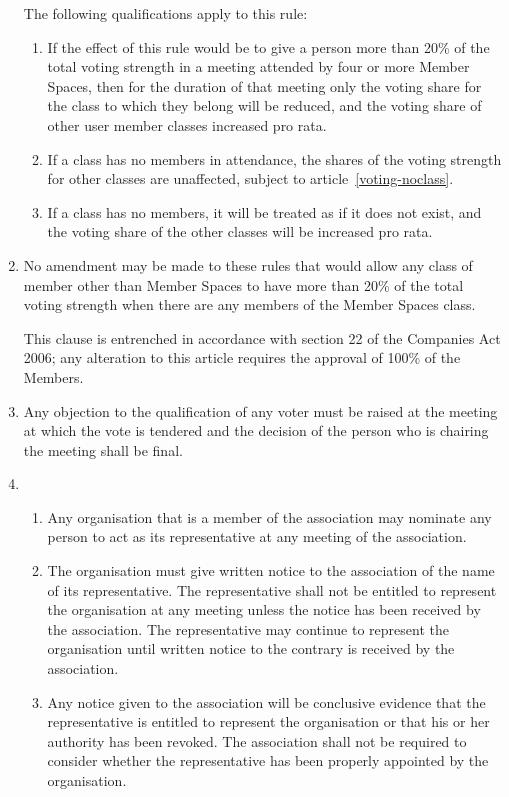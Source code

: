 \begin{enumerate}
    The following qualifications apply to this rule:
    \begin{enumerate}
      \item
        If the effect of this rule would be to give a person more than
        20\% of the total voting strength in a meeting attended by four
        or more Member Spaces, then for the duration of that meeting only
        the voting share for the class to which they belong will be reduced,
        and the voting share of other user member classes increased pro rata.
      \item
        If a class has no members in attendance, the shares of the voting
	strength for other classes are unaffected, subject to 
	article~\ref{voting-noclass}.
      \item
	\label{voting-noclass}
	If a class has no members, it will be treated as if it does not exist,
	and the voting share of the other classes will be increased pro rata.
    \end{enumerate}
\item
      No amendment may be made to these rules that would allow any class of
      member other than Member Spaces to have more than 20\% of the total
      voting strength when there are any members of the Member Spaces class.

      This clause is entrenched in accordance with section 22 of the
      Companies Act 2006; any alteration to this article requires the approval of
      100\% of the Members.
\item
      Any objection to the qualification of any voter must be raised at
      the meeting at which the vote is tendered and the decision of the
      person who is chairing the meeting shall be final.
\item
  \begin{enumerate}
  \item
      Any organisation that is a member of the association may nominate any
      person to act as its representative at any meeting of the association.
  \item
      The organisation must give written notice to the association of the
      name of its representative. The representative shall not be
      entitled to represent the organisation at any meeting unless the
      notice has been received by the association. The representative may
      continue to represent the organisation until written notice to the
      contrary is received by the association.
  \item
      Any notice given to the association will be conclusive evidence that
      the representative is entitled to represent the organisation or
      that his or her authority has been revoked. The association shall not
      be required to consider whether the representative has been
      properly appointed by the organisation.
  \end{enumerate}



\end{enumerate}
